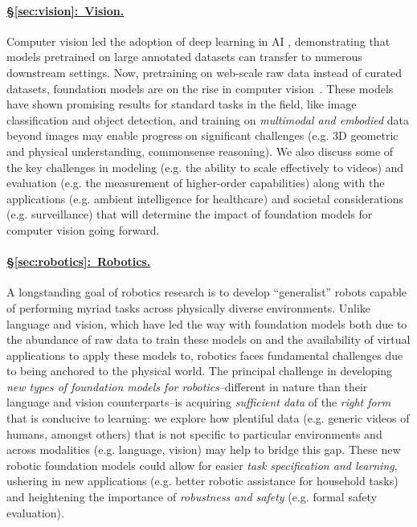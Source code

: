 \paragraph{\hyperref[sec:vision]{§\ref{sec:vision}:~Vision.}}
Computer vision led the adoption of deep learning in AI \cite{russakovsky2015imagenet}, demonstrating that models pretrained on large annotated datasets can transfer to numerous downstream settings. Now, pretraining on web-scale raw data instead of curated datasets, foundation models are on the rise in computer vision~\citep[e.g. ][]{radford2021learning}. These models have shown promising results for standard tasks in the field, like image classification and object detection, and training on \textit{multimodal and embodied} data beyond images may enable progress on significant challenges (e.g. 3D geometric and physical understanding, commonsense reasoning). We also discuss some of the key challenges in modeling (e.g. the ability to scale effectively to videos) and evaluation (e.g. the measurement of higher-order capabilities) along with the applications (e.g. ambient intelligence for healthcare) and societal considerations (e.g. surveillance) that will determine the impact of foundation models for computer vision going forward.

\paragraph{\hyperref[sec:robotics]{§\ref{sec:robotics}:~Robotics.}}

A longstanding goal of robotics research is to develop ``generalist'' robots capable of performing myriad tasks across physically diverse environments. Unlike language and vision, which have led the way with foundation models both due to the abundance of raw data to train these models on and the availability of virtual applications to apply these models to, robotics faces fundamental challenges due to being anchored to the physical world. The principal challenge in developing \textit{new types of foundation models for robotics}--different in nature than their language and vision counterparts--is acquiring \textit{sufficient data} of the \textit{right form} that is conducive to learning: we explore how plentiful data (e.g. generic videos of humans, amongst others) that is not specific to particular environments and across modalities (e.g. language, vision) may help to bridge this gap. These new robotic foundation models could allow for easier \textit{task specification and learning}, ushering in new applications (e.g. better robotic assistance for household tasks) and heightening the importance of \textit{robustness and safety} (e.g. formal safety evaluation).

